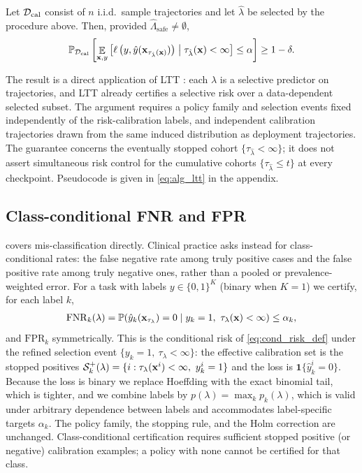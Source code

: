 \begin{corollary}
    \label{thm:conditional_risk}
    Let $\mathcal{D}_{\text{cal}}$ consist of $n$ i.i.d.\ sample trajectories and let $\hat{\lambda}$ be selected by the procedure above. Then, provided $\widehat{\Lambda}_{\text{safe}} \neq \emptyset$,
    \begin{align}
        \mathbb{P}_{\mathcal{D}_{\text{cal}}}\left[ \mathop{\mathbb{E}}_{\mathbf{x}, y} \left[ \ell\left(y, \hat{y}(\mathbf{x}_{\tau_{\hat\lambda}(\mathbf{x})})\right) \;\middle|\; \tau_{\hat{\lambda}}(\mathbf{x}) < \infty \right] \leq \alpha \right] \geq 1 - \delta.
    \end{align}
\end{corollary}
The result is a direct application of LTT \citep{angelopoulos2025learn}: each $\lambda$ is a selective predictor on trajectories, and LTT already certifies a selective risk over a data-dependent selected subset. 
The argument requires a policy family and selection events fixed independently of the risk-calibration labels, and independent calibration trajectories drawn from the same induced distribution as deployment trajectories. The guarantee concerns the eventually stopped cohort $\{\tau_{\hat\lambda}<\infty\}$; it does not assert simultaneous risk control for the cumulative cohorts $\{\tau_{\hat\lambda}\le t\}$ at every checkpoint.
Pseudocode is given in \cref{eq:alg_ltt} in the appendix.

\subsection{Class-conditional FNR and FPR}
\label{sec:fnr_fpr}
 covers mis-classification directly. Clinical practice asks instead for class-conditional rates: the false negative rate among truly positive cases and the false positive rate among truly negative ones, rather than a pooled or prevalence-weighted error. For a task with labels $y \in \{0,1\}^K$ (binary when $K=1$) we certify, for each label $k$,
\begin{align}
    \mathrm{FNR}_k(\lambda) = \mathbb{P}\!\left(\hat{y}_k(\mathbf{x}_{\tau_\lambda}) = 0 \;\middle|\; y_k = 1,\ \tau_\lambda(\mathbf{x}) < \infty\right) \le \alpha_k,
\end{align}
and $\mathrm{FPR}_k$ symmetrically. This is the conditional risk of \cref{eq:cond_risk_def} under the refined selection event $\{y_k = 1,\ \tau_\lambda < \infty\}$: the effective calibration set is the stopped positives $\mathcal{S}^+_k(\lambda) = \{ i : \tau_\lambda(\mathbf{x}^i) < \infty,\ y^{i}_k=1 \}$ and the loss is $\mathbf{1}\{\hat y^i_{k}=0\}$. Because the loss is binary we replace Hoeffding with the exact binomial tail, which is tighter, and we combine labels by $p(\lambda) = \max_k p_k(\lambda)$, which is valid under arbitrary dependence between labels and accommodates label-specific targets $\alpha_k$. The policy family, the stopping rule, and the Holm correction are unchanged. Class-conditional certification requires sufficient stopped positive (or negative) calibration examples; a policy with none cannot be certified for that class.

